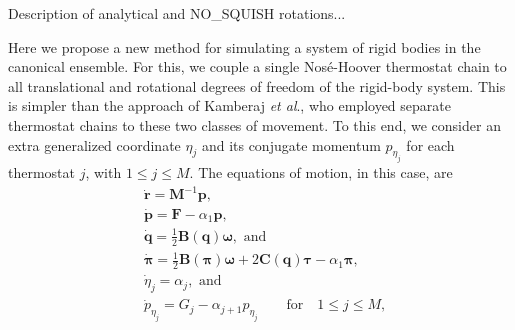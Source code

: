 \documentclass[journal=jctcce,manuscript=article,layout=twocolumn]{achemso}
\newcommand{\mt}[1]{\boldsymbol{\mathbf{#1}}}   %
\newcommand{\vt}[1]{\boldsymbol{\mathbf{#1}}}   %
\begin{document}
Description of analytical and NO\_SQUISH rotations...

Here we propose a new method for simulating a system of rigid bodies in the canonical ensemble. For this, we couple a single Nos\'{e}-Hoover thermostat chain \cite{Martyna_1992} to all translational and rotational degrees of freedom of the rigid-body system. This is simpler than the approach of Kamberaj \textit{et al}.,\cite{Kamberaj_2005} who employed separate thermostat chains to these two classes of movement. To this end, we consider an extra generalized coordinate $\eta_j$ and its conjugate momentum $p_{\eta_j}$ for each thermostat $j$, with $1 \leq j \le M$. The equations of motion, in this case, are
\begin{subequations}
	\label{eq:ODE system for NVT}
	\begin{align}
%
\label{eq:nhc_r}
	&\dot{\vt r} =
	{\mt M}^{-1} {\vt p}, \\
%
\label{eq:nhc_p} 
	&\dot{\vt p} =
	{\vt F} - \alpha_1 {\vt p},\\
%
\label{eq:nhc_q}
	&\dot{\vt q} =
	\frac{1}{2} \mt B(\vt q) \vt \omega, \text{ and} \\
%
\label{eq:nhc_pi}
	&\dot{\vt \pi} =
	\frac{1}{2} \mt B(\vt \pi) \vt \omega + 2 \mt C(\vt q) \vt \tau - \alpha_1 {\vt \pi}, \\
%
\label{eq:nhc_eta}
	&\dot{\eta}_j = \alpha_j, \text{ and} \\
%
\label{eq:nhc_p_eta}
	&{\dot p}_{\eta_j} = G_j - \alpha_{j+1} p_{\eta_j} \qquad \text{for} \quad 1 \leq j \le M,
	\end{align}
\end{subequations}
\end{document}
